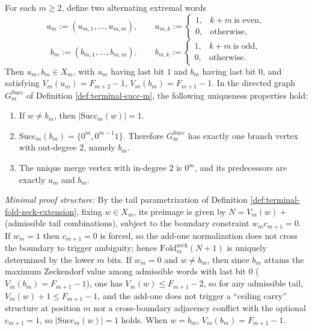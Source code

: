 \begin{enumerate}
  \begin{theorem}\label{thm:terminal-succ-unique-branch-merge}
  For each \(m\ge 2\), define two alternating extremal words
  \[
  u_m:=(u_{m,1},\dots,u_{m,m}),\qquad
  u_{m,k}:=
  \begin{cases}
    1,& k+m\ \text{is even},\\
    0,& \text{otherwise},
  \end{cases}
  \]
  \[
  b_m:=(b_{m,1},\dots,b_{m,m}),\qquad
  b_{m,k}:=
  \begin{cases}
    1,& k+m\ \text{is odd},\\
    0,& \text{otherwise}.
  \end{cases}
  \]
  Then \(u_m,b_m\in X_m\), with \(u_m\) having last bit \(1\) and \(b_m\) having last bit \(0\), and satisfying
  \(V_m(u_m)=F_{m+2}-1\), \(V_m(b_m)=F_{m+1}-1\).
  In the directed graph \(G^{\mathrm{Succ}}_m\) of Definition \ref{def:terminal-succ-m}, the following uniqueness properties hold:
  \begin{enumerate}
    \item If \(w\neq b_m\), then \(|\mathrm{Succ}_m(w)|=1\).
    \item \(\mathrm{Succ}_m(b_m)=\{0^m,0^{m-1}1\}\). Therefore \(G^{\mathrm{Succ}}_m\) has exactly one branch vertex with out-degree \(2\), namely \(b_m\).
    \item The unique merge vertex with in-degree \(2\) is \(0^m\), and its predecessors are exactly \(u_m\) and \(b_m\).
  \end{enumerate}
  \emph{Minimal proof structure:} By the tail parametrization of Definition \ref{def:terminal-fold-zeck-extension}, fixing \(w\in X_m\), its preimage is given by \(N=V_m(w)+\)(admissible tail combinations), subject to the boundary constraint \(w_m c_{m+1}=0\).
  If \(w_m=1\) then \(c_{m+1}=0\) is forced, so the add-one normalization does not cross the boundary to trigger ambiguity; hence \(\mathrm{Fold}^{\mathrm{zeck}}_m(N+1)\) is uniquely determined by the lower \(m\) bits.
  If \(w_m=0\) and \(w\neq b_m\), then since \(b_m\) attains the maximum Zeckendorf value among admissible words with last bit \(0\) (\(V_m(b_m)=F_{m+1}-1\)), one has \(V_m(w)\le F_{m+1}-2\), so for any admissible tail, \(V_m(w)+1\le F_{m+1}-1\), and the add-one does not trigger a ``ceiling carry'' structure at position \(m\) nor a cross-boundary adjacency conflict with the optional \(c_{m+1}=1\), so \(|\mathrm{Succ}_m(w)|=1\) holds.
  When \(w=b_m\), \(V_m(b_m)=F_{m+1}-1\).

\end{theorem}
\end{enumerate}
